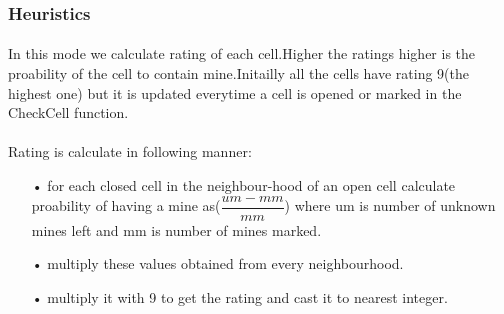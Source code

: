 \documentclass[12pt,a4paper]{report}
\begin{document}
\subsubsection{Heuristics}
\paragraph*{}
In this mode we calculate rating of each cell.Higher the ratings higher is the proability of the cell to contain mine.Initailly all the cells have rating 9(the highest one) but it is updated everytime a cell is opened or marked in the CheckCell function.
\paragraph*{}
Rating is calculate in following manner:
\begin{itemize}
\item[•]for each closed cell in the neighbour-hood of an open cell calculate proability of having a mine as($ \dfrac{um-mm}{mm} $) where um is number of unknown mines left and mm is number of mines marked.
\item[•]multiply these values obtained from every neighbourhood.
\item[•]multiply it with 9 to get the rating and cast it to nearest integer.
\end{itemize}
\end{document}
